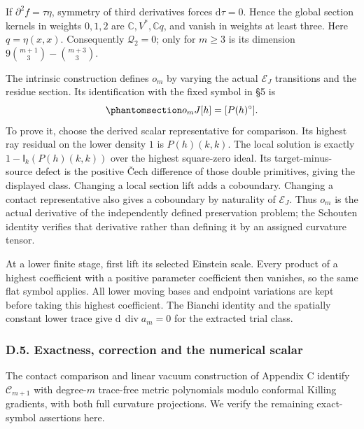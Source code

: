 \documentclass[
  english,
  11pt,
  reqno]{amsart}
\begin{document}
If \(\partial^2f=\tau\eta\), symmetry of third derivatives forces
\(\mathrm d\tau=0\). Hence the global section kernels in weights
\(0,1,2\) are \(\mathbb C,V^*,\mathbb Cq\), and vanish in weights at
least three. Here \(q=\eta(x,x)\). Consequently \(\mathcal Q_2=0\); only
for \(m\ge3\) is its dimension \(9\binom{m+1}{3}-\binom{m+3}{3}\).

The intrinsic construction defines \(o_m\) by varying the actual
\(\mathcal E_J\) transitions and the residue section. Its identification
with the fixed symbol in §5 is
\begin{equation}\protect\phantomsection\label{eq:gg-app-intrinsic-contact-derivative}{
 o_mJ[h]=[P(h)^\circ].
}\end{equation} To prove it, choose the derived scalar representative
for comparison. Its highest ray residual on the lower density \(1\) is
\(P(h)(k,k)\). The local solution is exactly
\(1-\mathsf I_k(P(h)(k,k))\) over the highest square-zero ideal. Its
target-minus-source defect is the positive Čech difference of those
double primitives, giving the displayed class. Changing a local section
lift adds a coboundary. Changing a contact representative also gives a
coboundary by naturality of \(\mathcal E_J\). Thus \(o_m\) is the actual
derivative of the independently defined preservation problem; the
Schouten identity verifies that derivative rather than defining it by an
assigned curvature tensor.

At a lower finite stage, first lift its selected Einstein scale. Every
product of a highest coefficient with a positive parameter coefficient
then vanishes, so the same flat symbol applies. All lower moving bases
and endpoint variations are kept before taking this highest coefficient.
The Bianchi identity and the spatially constant lower trace give
\(\mathrm d\,\operatorname{div}a_m=0\) for the extracted trial class.

\protect{}\label{sec:gg-optical-correction-exactness}

\subsubsection{D.5. Exactness, correction and the numerical
scalar}\label{d.5.-exactness-correction-and-the-numerical-scalar}

The contact comparison and linear vacuum construction of Appendix C
identify \(\mathcal C_{m+1}\) with degree-\(m\) trace-free metric
polynomials modulo conformal Killing gradients, with both full curvature
projections. We verify the remaining exact-symbol assertions here.
\end{document}
